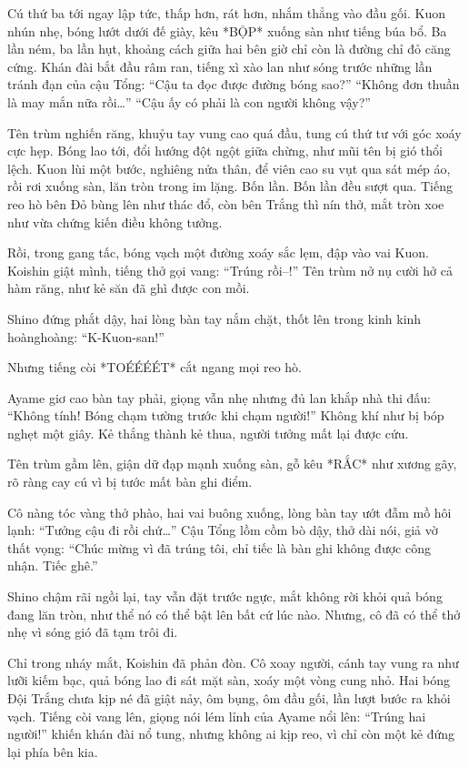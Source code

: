 \documentclass[../main.tex]{subfiles}
\begin{document}
Cú thứ ba tới ngay lập tức, thấp hơn, rát hơn, nhắm thẳng vào đầu gối. Kuon nhún nhẹ, bóng lướt dưới đế giày, kêu *BỘP* xuống sàn như tiếng búa bổ. Ba lần ném, ba lần hụt, khoảng cách giữa hai bên giờ chỉ còn là đường chỉ đỏ căng cứng. Khán đài bắt đầu râm ran, tiếng xì xào lan như sóng trước những lần tránh đạn của cậu Tổng: ``Cậu ta đọc được đường bóng sao?'' ``Không đơn thuần là may mắn nữa rồi\dots'' ``Cậu ấy có phải là con người không vậy?''

Tên trùm nghiến răng, khuỷu tay vung cao quá đầu, tung cú thứ tư với góc xoáy cực hẹp. Bóng lao tới, đổi hướng đột ngột giữa chừng, như mũi tên bị gió thổi lệch. Kuon lùi một bước, nghiêng nửa thân, để viên cao su vụt qua sát mép áo, rồi rơi xuống sàn, lăn tròn trong im lặng. Bốn lần. Bốn lần đều sượt qua. Tiếng reo hò bên Đỏ bùng lên như thác đổ, còn bên Trắng thì nín thở, mắt tròn xoe như vừa chứng kiến điều không tưởng.

Rồi, trong gang tấc, bóng vạch một đường xoáy sắc lẹm, đập vào vai Kuon. Koishin giật mình, tiếng thở gọi vang: ``Trúng rồi--!'' Tên trùm nở nụ cười hở cả hàm răng, như kẻ săn đã ghì được con mồi.

Shino đứng phắt dậy, hai lòng bàn tay nắm chặt, thốt lên trong kinh kinh hoànghoàng: ``K-Kuon-san!''

Nhưng tiếng còi *TOÉÉÉÉT* cắt ngang mọi reo hò.

Ayame giơ cao bàn tay phải, giọng vẫn nhẹ nhưng đủ lan khắp nhà thi đấu: ``Không tính! Bóng chạm tường trước khi chạm người!'' Không khí như bị bóp nghẹt một giây. Kẻ thắng thành kẻ thua, người tưởng mất lại được cứu.

Tên trùm gầm lên, giận dữ đạp mạnh xuống sàn, gỗ kêu *RẮC* như xương gãy, rõ ràng cay cú vì bị tước mất bàn ghi điểm.

Cô nàng tóc vàng thở phào, hai vai buông xuống, lòng bàn tay ướt đẫm mồ hôi lạnh: ``Tưởng cậu đi rồi chứ\dots'' Cậu Tổng lồm cồm bò dậy, thở dài nói, giả vờ thất vọng: ``Chúc mừng vì đã trúng tôi, chỉ tiếc là bàn ghi không được công nhận. Tiếc ghê.''

Shino chậm rãi ngồi lại, tay vẫn đặt trước ngực, mắt không rời khỏi quả bóng đang lăn tròn, như thể nó có thể bật lên bất cứ lúc nào. Nhưng, cô đã có thể thở nhẹ vì sóng gió đã tạm trôi đi.

Chỉ trong nháy mắt, Koishin đã phản đòn. Cô xoay người, cánh tay vung ra như lưỡi kiếm bạc, quả bóng lao đi sát mặt sàn, xoáy một vòng cung nhỏ. Hai bóng Đội Trắng chưa kịp né đã giật nảy, ôm bụng, ôm đầu gối, lần lượt bước ra khỏi vạch. Tiếng còi vang lên, giọng nói lém lỉnh của Ayame nổi lên: ``Trúng hai người!'' khiến khán đài nổ tung, nhưng không ai kịp reo, vì chỉ còn một kẻ đứng lại phía bên kia.
\end{document}
